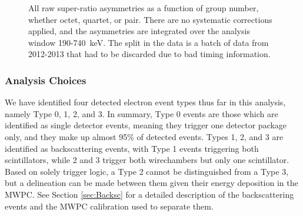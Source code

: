 \begin{figure}
  \caption{All raw super-ratio asymmetries as a function of group number, whether octet, quartet, or pair.
    There are no systematic corrections applied, and the asymmetries are integrated over the analysis window 190-740~keV.
    The split in the data is a batch of data from 2012-2013 that had to be discarded due to bad timing information.}
  \label{fig:RawAsymms}
\end{figure}

\subsubsection{Analysis Choices} \label{sssec::anaChoices}

We have identified four detected electron event types thus far in this analysis, namely Type 0, 1,
2, and 3. In summary, Type 0 events are those which are identified as single detector events, meaning they
trigger one detector package only, and they make up almost 95\% of detected events. Types 1, 2, and 3
are identified as backscattering events, with Type 1 events triggering both scintillators, while 2 and 3
trigger both wirechambers but only one scintillator. Based on solely trigger logic, a Type 2 cannot be
distinguished from a Type 3, but a delineation can be made between them given their energy deposition
in the MWPC. See Section \ref{sec:Backsc} for a detailed description of the backscattering events and
the MWPC calibration used to separate them.


